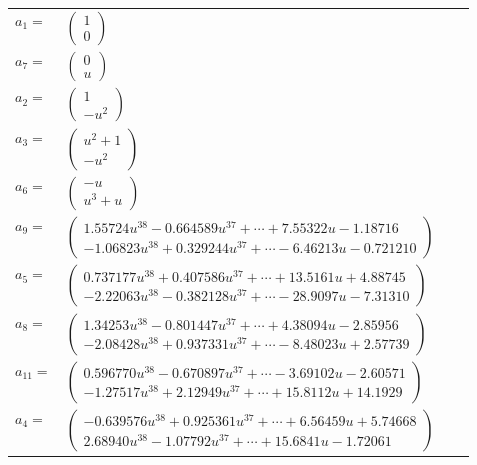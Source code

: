 \documentclass[1p]{elsarticle_modified}
\theoremstyle{definition}
\begin{document}
\begin{tabular}{m{7pt} m{180pt} m{7pt} m{180pt} }
\flushright $a_{1}=$&$\begin{pmatrix}1\\0\end{pmatrix}$ \\
\flushright $a_{7}=$&$\begin{pmatrix}0\\u\end{pmatrix}$ \\
\flushright $a_{2}=$&$\begin{pmatrix}1\\- u^2\end{pmatrix}$ \\
\flushright $a_{3}=$&$\begin{pmatrix}u^2+1\\- u^2\end{pmatrix}$ \\
\flushright $a_{6}=$&$\begin{pmatrix}- u\\u^3+u\end{pmatrix}$ \\
\flushright $a_{9}=$&$\begin{pmatrix}1.55724 u^{38}-0.664589 u^{37}+\cdots+7.55322 u-1.18716\\-1.06823 u^{38}+0.329244 u^{37}+\cdots-6.46213 u-0.721210\end{pmatrix}$ \\
\flushright $a_{5}=$&$\begin{pmatrix}0.737177 u^{38}+0.407586 u^{37}+\cdots+13.5161 u+4.88745\\-2.22063 u^{38}-0.382128 u^{37}+\cdots-28.9097 u-7.31310\end{pmatrix}$ \\
\flushright $a_{8}=$&$\begin{pmatrix}1.34253 u^{38}-0.801447 u^{37}+\cdots+4.38094 u-2.85956\\-2.08428 u^{38}+0.937331 u^{37}+\cdots-8.48023 u+2.57739\end{pmatrix}$ \\
\flushright $a_{11}=$&$\begin{pmatrix}0.596770 u^{38}-0.670897 u^{37}+\cdots-3.69102 u-2.60571\\-1.27517 u^{38}+2.12949 u^{37}+\cdots+15.8112 u+14.1929\end{pmatrix}$ \\
\flushright $a_{4}=$&$\begin{pmatrix}-0.639576 u^{38}+0.925361 u^{37}+\cdots+6.56459 u+5.74668\\2.68940 u^{38}-1.07792 u^{37}+\cdots+15.6841 u-1.72061\end{pmatrix}$ \\

\end{tabular}
\end{document}
